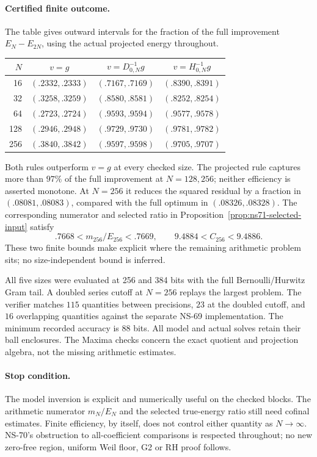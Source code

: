 \documentclass[11pt]{article}
\theoremstyle{remark}
\begin{document}
\paragraph{Certified finite outcome.}
The table gives outward intervals for the fraction of the full
improvement $E_N-E_{2N}$, using the actual projected energy throughout.
\begin{center}\small
\begin{tabular}{rccc}
\toprule
$N$ & $v=g$ & $v=D_{0,N}^{-1}g$ & $v=H_{0,N}^{-1}g$\\
\midrule
16 & $(.2332,.2333)$ & $(.7167,.7169)$ & $(.8390,.8391)$\\
32 & $(.3258,.3259)$ & $(.8580,.8581)$ & $(.8252,.8254)$\\
64 & $(.2723,.2724)$ & $(.9593,.9594)$ & $(.9577,.9578)$\\
128 & $(.2946,.2948)$ & $(.9729,.9730)$ & $(.9781,.9782)$\\
256 & $(.3840,.3842)$ & $(.9597,.9598)$ & $(.9705,.9707)$\\
\bottomrule
\end{tabular}\end{center}
Both rules outperform $v=g$ at every checked size. The projected
rule captures more than $97\%$ of the full improvement at $N=128,256$;
neither efficiency is asserted monotone. At $N=256$ it reduces the
squared residual by a fraction in $(.08081,.08083)$, compared with
the full optimum in $(.08326,.08328)$. The corresponding numerator
and selected ratio in Proposition~\ref{prop:ns71-selected-input}
satisfy
\[
 .7668< m_{256}/E_{256}<.7669,\qquad
 9.4884<C_{256}<9.4886.
\]
These two finite bounds make explicit where the remaining arithmetic
problem sits; no size-independent bound is inferred.

All five sizes were evaluated at 256 and 384 bits with the full
Bernoulli/Hurwitz Gram tail. A doubled series cutoff at $N=256$
replays the largest problem. The verifier matches $115$ quantities
between precisions, $23$ at the doubled cutoff, and $16$ overlapping
quantities against the separate NS-69 implementation. The minimum
recorded accuracy is $88$ bits. All model and actual solves retain
their ball enclosures. The Maxima checks concern the exact quotient
and projection algebra, not the missing arithmetic estimates.

\paragraph{Stop condition.}
The model inversion is explicit and numerically useful on the checked
blocks. The arithmetic numerator $m_N/E_N$ and the selected true-energy
ratio still need cofinal estimates. Finite efficiency, by itself,
does not control either quantity as $N\to\infty$. NS-70's obstruction
to all-coefficient comparisons is respected throughout; no new
zero-free region, uniform Weil floor, G2 or RH proof follows.
\end{document}
